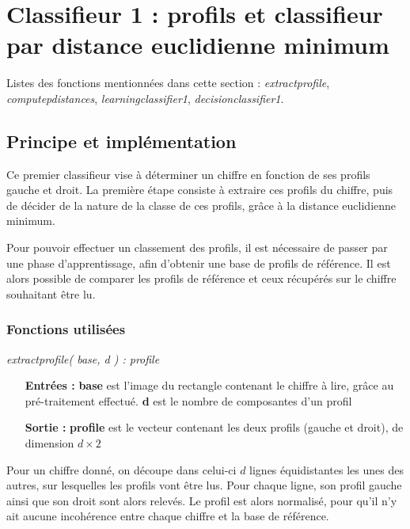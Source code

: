 \section{Classifieur 1 : profils et classifieur par distance euclidienne minimum}

Listes des fonctions mentionnées dans cette section : \textit{extractprofile}, \textit{computepdistances}, \textit{learningclassifier1}, \textit{decisionclassifier1}.

\subsection{Principe et implémentation}

Ce premier classifieur vise à déterminer un chiffre en fonction de ses profils gauche et droit. La première étape consiste à extraire ces profils du chiffre, puis de décider de la nature de la classe de ces profils, grâce à la distance euclidienne minimum.

Pour pouvoir effectuer un classement des profils, il est nécessaire de passer par une phase d'apprentissage, afin d'obtenir une base de profils de référence. Il est alors possible de comparer les profils de référence et ceux récupérés sur le chiffre souhaitant être lu.

\subsubsection{Fonctions utilisées}

\textit{extractprofile( base, d ) : profile}\\
\begin{itemize}
	\item[\textbf{Entrées :}] \textbf{base} est l'image du rectangle contenant le chiffre à lire, grâce au pré-traitement effectué. \textbf{d} est le nombre de composantes d'un profil
	\item[\textbf{Sortie :}] \textbf{profile} est le vecteur contenant les deux profils (gauche et droit), de dimension $d\times2$
\end{itemize}
Pour un chiffre donné, on découpe dans celui-ci $d$ lignes équidistantes les unes des autres, sur lesquelles les profils vont être lus. Pour chaque ligne, son profil gauche ainsi que son droit sont alors relevés. Le profil est alors normalisé, pour qu'il n'y ait aucune incohérence entre chaque chiffre et la base de référence.\\


